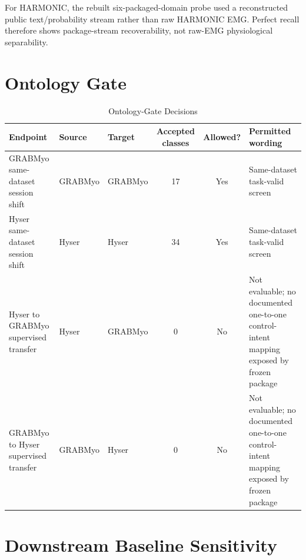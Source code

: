 \documentclass[journal]{IEEEtran}
\begin{document}
For HARMONIC, the rebuilt six-packaged-domain probe used a reconstructed public text/probability stream rather than raw HARMONIC EMG. Perfect recall therefore shows package-stream recoverability, not raw-EMG physiological separability.

\section{Ontology Gate}

\begin{table}[!t]
\caption{Ontology-Gate Decisions}
\label{tab:s_ontology}
\centering
\footnotesize
\begin{tabularx}{\textwidth}{@{}p{3.0cm}p{2.3cm}p{2.3cm}ccY@{}}
\toprule
Endpoint & Source & Target & Accepted classes & Allowed? & Permitted wording \\
\midrule
GRABMyo same-dataset session shift & GRABMyo & GRABMyo & 17 & Yes & Same-dataset task-valid screen \\
Hyser same-dataset session shift & Hyser & Hyser & 34 & Yes & Same-dataset task-valid screen \\
Hyser to GRABMyo supervised transfer & Hyser & GRABMyo & 0 & No & Not evaluable; no documented one-to-one control-intent mapping exposed by frozen package \\
GRABMyo to Hyser supervised transfer & GRABMyo & Hyser & 0 & No & Not evaluable; no documented one-to-one control-intent mapping exposed by frozen package \\
\bottomrule
\end{tabularx}
\end{table}

\section{Downstream Baseline Sensitivity}
\end{document}
